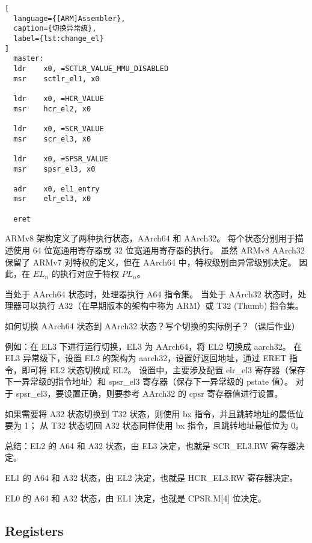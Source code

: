 \begin{lstlisting}[
  language={[ARM]Assembler},
  caption={切换异常级},
  label={lst:change_el}
]
  master:
  ldr    x0, =SCTLR_VALUE_MMU_DISABLED
  msr    sctlr_el1, x0

  ldr    x0, =HCR_VALUE
  msr    hcr_el2, x0

  ldr    x0, =SCR_VALUE
  msr    scr_el3, x0

  ldr    x0, =SPSR_VALUE
  msr    spsr_el3, x0

  adr    x0, el1_entry
  msr    elr_el3, x0

  eret
\end{lstlisting}

ARMv8 架构定义了两种执行状态，AArch64 和 AArch32。
每个状态分别用于描述使用 64 位宽通用寄存器或 32 位宽通用寄存器的执行。
虽然 ARMv8 AArch32 保留了 ARMv7 对特权的定义，但在 AArch64 中，特权级别由异常级别决定。
因此，在 $EL_n$ 的执行对应于特权 $PL_n$。

当处于 AArch64 状态时，处理器执行 A64 指令集。
当处于 AArch32 状态时，处理器可以执行 A32（在早期版本的架构中称为 ARM）或 T32 (Thumb) 指令集。

\begin{probsolu}[title={Problem and Solution \theprob}]{
    如何切换 AArch64 状态到 AArch32 状态？写个切换的实际例子？（课后作业）
  }\label{pb:state_changing}
  
  例如：在 EL3 下进行运行切换，EL3 为 AArch64，将 EL2 切换成 aarch32。
  在 EL3 异常级下，设置 EL2 的架构为 aarch32，设置好返回地址，通过 ERET 指令，即可将 EL2 状态切换成 EL2。
  设置中，主要涉及配置 elr\_el3 寄存器（保存下一异常级的指令地址）和 spsr\_el3 寄存器（保存下一异常级的 pstate 值）。
  对于 spsr\_el3，要设置正确，则要参考 AArch32 的 cpsr 寄存器值进行设置。

  如果需要将 A32 状态切换到 T32 状态，则使用 bx 指令，并且跳转地址的最低位要为 1；
  从 T32 状态切回 A32 状态同样使用 bx 指令，且跳转地址最低位为 0。
  
  总结：EL2 的 A64 和 A32 状态，由 EL3 决定，也就是 SCR\_EL3.RW 寄存器决定。

  EL1 的 A64 和 A32 状态，由 EL2 决定，也就是 HCR\_EL3.RW 寄存器决定。

  EL0 的 A64 和 A32 状态，由 EL1 决定，也就是 CPSR.M[4] 位决定。
\end{probsolu}

\subsection{Registers}

